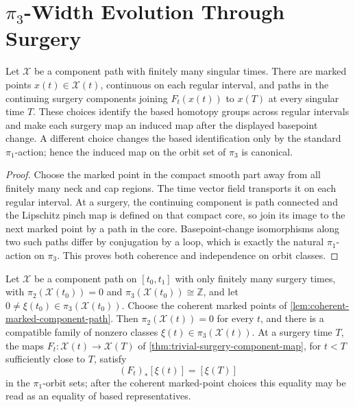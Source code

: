 \section{\texorpdfstring{$\pi_3$}{pi3}-Width Evolution Through Surgery}

\begin{lemma}
\label{lem:coherent-marked-component-path}
\notready
Let $\mathcal X$ be a component path with finitely many singular times.
There are marked points $x(t)\in\mathcal X(t)$, continuous on each regular
interval, and paths in the continuing surgery components joining
$F_t(x(t))$ to $x(T)$ at every singular time $T$.  These choices identify
the based homotopy groups across regular intervals and make each surgery map
an induced map after the displayed basepoint change.  A different choice
changes the based identification only by the standard $\pi_1$-action; hence
the induced map on the orbit set of $\pi_3$ is canonical.
\end{lemma}

\begin{proof}
Choose the marked point in the compact smooth part away from all finitely many
neck and cap regions.  The time vector field transports it on each regular
interval.  At a surgery, the continuing component is path connected and the
Lipschitz pinch map is defined on that compact core, so join its image to the
next marked point by a path in the core.  Basepoint-change isomorphisms along
two such paths differ by conjugation by a loop, which is exactly the natural
$\pi_1$-action on $\pi_3$.  This proves both coherence and independence on
orbit classes.
\end{proof}

\begin{theorem}
\label{thm:surgery-pi3-class-transport}
\notready
Let $\mathcal X$ be a component path on $[t_0,t_1]$ with only finitely many
surgery times, with
$\pi_2(\mathcal X(t_0))=0$ and
$\pi_3(\mathcal X(t_0))\cong\mathbb Z$, and let
$0\ne\xi(t_0)\in\pi_3(\mathcal X(t_0))$.  Choose the coherent marked
points of \ref{lem:coherent-marked-component-path}.  Then $\pi_2(\mathcal
X(t))=0$
for every $t$, and there is a compatible family of nonzero classes
$\xi(t)\in\pi_3(\mathcal X(t))$.  At a surgery time $T$, the maps
$F_t\colon\mathcal X(t)\to\mathcal X(T)$ of
\ref{thm:trivial-surgery-component-map}, for $t<T$ sufficiently close to $T$,
satisfy
\[
 (F_t)_*[\xi(t)]=[\xi(T)]
\]
in the $\pi_1$-orbit sets; after the coherent marked-point choices this
equality may be read as an equality of based representatives.
\end{theorem}

